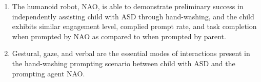 \begin{enumerate}
	\item The humanoid robot, NAO, is able to demonstrate preliminary success in independently assisting child with ASD through hand-washing, and the child exhibits similar engagement level, complied prompt rate, and task completion when prompted by NAO as compared to when prompted by parent.
	
	\item Gestural, gaze, and verbal are the essential modes of interactions present in the hand-washing prompting scenario between child with ASD and the prompting agent NAO.
	
	
\end{enumerate}
